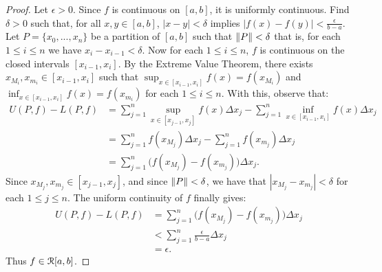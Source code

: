 \documentclass[10pt,twoside,openany]{memoir}
\begin{document}
        \begin{proof}
            Let $\epsilon > 0$. Since $f$ is continuous on $[a,b]$, it is uniformly continuous. Find $\delta > 0$ such that, for all $x,y \in [a,b]$, $|x-y| < \delta$ implies $|f(x) - f(y)| < \frac{\epsilon}{b-a}$. Let $P = \{x_0,...,x_n\}$ be a partition of $[a,b]$ such that $\left\lVert P \right\rVert < \delta$ \textemdash that is, for each $1 \leq i \leq n$ we have $x_i - x_{i-1} < \delta$. Now for each $1 \leq i \leq n$, $f$ is continuous on the closed intervals $[x_{i-1},x_i]$. By the Extreme Value Theorem, there exists $x_{M_i},x_{m_i} \in [x_{i-1},x_i]$ such that $\sup_{x \in [x_{i-1},x_i]}f(x) = f(x_{M_i})$ and $\inf_{x \in [x_{i-1},x_i]}f(x) = f(x_{m_i})$ for each $1 \leq i \leq n$. With this, observe that:
                \begin{equation*}
                \begin{split}
                    U(P,f) - L(P,f) 
                    & = \sum_{j = 1}^n \sup_{x \in [x_{j-1},x_j]}f(x)\Delta x_j - \sum_{j = 1}^n \inf_{x \in [x_{i-1},x_i]}f(x)\Delta x_j \\
                    & = \sum_{j = 1}^n f(x_{M_j})\Delta x_j - \sum_{j = 1}^n f(x_{m_j})\Delta x_j \\
                    & = \sum_{j=1}^n \bigl(f(x_{M_j}) - f(x_{m_j})\bigr)\Delta x_j.
                \end{split}
                \end{equation*}
            Since $x_{M_j},x_{m_j} \in [x_{j-1},x_j]$, and since $\left\lVert P \right\rVert < \delta$, we have that $|x_{M_j} - x_{m_j}| < \delta$ for each $1 \leq j \leq n$. The uniform continuity of $f$ finally gives:
                \begin{equation*}
                \begin{split}
                    U(P,f) - L(P,f)
                    & = \sum_{j=1}^n \bigl(f(x_{M_j}) - f(x_{m_j})\bigr)\Delta x_j \\
                    & < \sum_{j = 1}^n \frac{\epsilon}{b-a} \Delta x_j \\
                    & = \epsilon.
                \end{split}
                \end{equation*}
            Thus $f \in \mathcal{R}[a,b]$.
        \end{proof}
\end{document}
